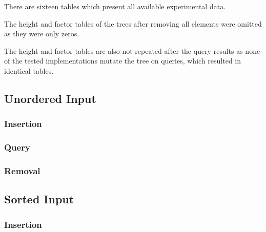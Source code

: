 \documentclass[12pt]{elsarticle}
\begin{document}
There are sixteen tables which present all available experimental data.

The height and factor tables of the trees after removing all elements were
omitted as they were only zeros.

The height and factor tables are also not repeated after the query results as
none of the tested implementations mutate the tree on queries, which resulted
in identical tables.

\subsection{Unordered Input}
\subsubsection{Insertion}








\subsubsection{Query}




% 

% 

\subsubsection{Removal}




% 

% 

\subsection{Sorted Input}
\subsubsection{Insertion}

\end{document}
